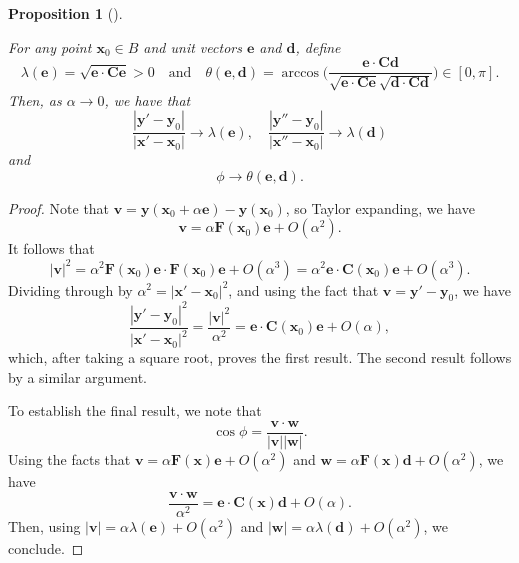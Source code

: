\documentclass[
  letterpaper,
  DIV=11,
  numbers=noendperiod]{scrreprt}
\theoremstyle{plain}
\newtheorem{proposition}{Proposition}[chapter]
\theoremstyle{remark}
\begin{document}
\begin{proposition}[]\protect\hypertarget{prp-CGstrainrelations}{}\label{prp-CGstrainrelations}

For any point \({\boldsymbol{x}}_0\in B\) and unit vectors
\({\boldsymbol{e}}\) and \({\boldsymbol{d}}\), define
\[\lambda({\boldsymbol{e}}) = \sqrt{{\boldsymbol{e}}\cdot{\boldsymbol{C}}{\boldsymbol{e}}}>0 \quad\text{and}\quad
    \theta({\boldsymbol{e}},{\boldsymbol{d}}) = \arccos\bigg(\frac{{\boldsymbol{e}}\cdot{\boldsymbol{C}}{\boldsymbol{d}}}{\sqrt{{\boldsymbol{e}}\cdot{\boldsymbol{C}}{\boldsymbol{e}}}\sqrt{{\boldsymbol{d}}\cdot{\boldsymbol{C}}{\boldsymbol{d}}}}\bigg)\in[0,\pi].\]
Then, as \(\alpha\to0\), we have that
\[\frac{|{\boldsymbol{y}}'-{\boldsymbol{y}}_0|}{|{\boldsymbol{x}}'-{\boldsymbol{x}}_0|}\to\lambda({\boldsymbol{e}}),\quad \frac{|{\boldsymbol{y}}''-{\boldsymbol{y}}_0|}{|{\boldsymbol{x}}''-{\boldsymbol{x}}_0|}\to\lambda({\boldsymbol{d}})\]
and \[\phi\to \theta({\boldsymbol{e}},{\boldsymbol{d}}).\]

\end{proposition}

\begin{proof}
Note that
\({\boldsymbol{v}}= {\boldsymbol{y}}({\boldsymbol{x}}_0+\alpha{\boldsymbol{e}})-{\boldsymbol{y}}({\boldsymbol{x}}_0)\),
so Taylor expanding, we have
\[{\boldsymbol{v}}= \alpha {\boldsymbol{F}}({\boldsymbol{x}}_0){\boldsymbol{e}}+{O}(\alpha^2).\]
It follows that
\[|{\boldsymbol{v}}|^2 = \alpha^2{\boldsymbol{F}}({\boldsymbol{x}}_0){\boldsymbol{e}}\cdot{\boldsymbol{F}}({\boldsymbol{x}}_0){\boldsymbol{e}}+{O}(\alpha^3) = \alpha^2 {\boldsymbol{e}}\cdot{\boldsymbol{C}}({\boldsymbol{x}}_0){\boldsymbol{e}}+{O}(\alpha^3).\]
Dividing through by
\(\alpha^2=|{\boldsymbol{x}}'-{\boldsymbol{x}}_0|^2\), and using the
fact that \({\boldsymbol{v}}={\boldsymbol{y}}'-{\boldsymbol{y}}_0\), we
have
\[\frac{|{\boldsymbol{y}}'-{\boldsymbol{y}}_0|^2}{|{\boldsymbol{x}}'-{\boldsymbol{x}}_0|^2} = \frac{|{\boldsymbol{v}}|^2}{\alpha^2} = {\boldsymbol{e}}\cdot{\boldsymbol{C}}({\boldsymbol{x}}_0){\boldsymbol{e}}+{O}(\alpha),\]
which, after taking a square root, proves the first result. The second
result follows by a similar argument.

To establish the final result, we note that
\[\cos\phi = \frac{{\boldsymbol{v}}\cdot{\boldsymbol{w}}}{|{\boldsymbol{v}}||{\boldsymbol{w}}|}.\]
Using the facts that
\({\boldsymbol{v}}=\alpha{\boldsymbol{F}}({\boldsymbol{x}}){\boldsymbol{e}}+{O}(\alpha^2)\)
and
\({\boldsymbol{w}}=\alpha{\boldsymbol{F}}({\boldsymbol{x}}){\boldsymbol{d}}+{O}(\alpha^2)\),
we have
\[\frac{{\boldsymbol{v}}\cdot{\boldsymbol{w}}}{\alpha^2} = {\boldsymbol{e}}\cdot{\boldsymbol{C}}({\boldsymbol{x}}){\boldsymbol{d}}+{O}(\alpha).\]
Then, using
\(|{\boldsymbol{v}}| = \alpha \lambda({\boldsymbol{e}})+{O}(\alpha^2)\)
and
\(|{\boldsymbol{w}}|=\alpha\lambda({\boldsymbol{d}})+{O}(\alpha^2)\), we
conclude.
\end{proof}
\end{document}
